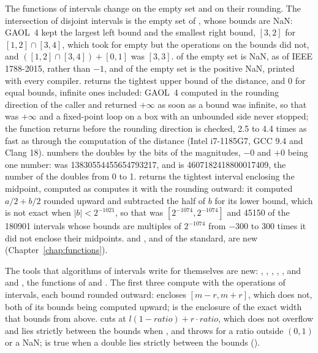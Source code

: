 \documentclass[12pt,a4paper,twoside,openright]{book}
\begin{document}
\medskip
The functions of intervals change on the empty set and on their
rounding.\newinvfive{} The intersection of disjoint intervals is the empty
set of , whose bounds are NaN: GAOL~4 kept the
largest left bound and the smallest right bound, $[3, 2]$ for
$[1, 2] \cap [3, 4]$, which  took for empty but the
operations on the bounds did not, and $([1, 2] \cap [3, 4]) + [0, 1]$ was
$[3, 3]$.  of the empty set is NaN, as  of IEEE
1788-2015, rather than $-1$, and  of the empty set is the
positive NaN, printed  with every compiler. 
returns the tightest upper bound of the distance, and 0 for equal bounds,
infinite ones included: GAOL~4 computed  in the rounding
direction of the caller and returned $+\infty$ as soon as a bound was
infinite, so that  was $+\infty$ and a
fixed-point loop on a box with an unbounded side never stopped; the function
returns before the rounding direction is checked, 2.5 to 4.4 times as fast as
through the computation of the distance (Intel i7-1185G7, GCC 9.4 and Clang
18).  numbers the doubles by the bits of the
magnitudes, $-0$ and $+0$ being one number: 
was 13830554455654793217, and is 4607182418800017409, the number of the
doubles from 0 to 1.  returns the tightest interval enclosing the
midpoint, computed as  computes it with the rounding
outward: it computed $a/2 + b/2$ rounded upward and subtracted the half of
$b$ for its lower bound, which is not exact when $|b| < 2^{-1021}$, so that
 was $[2^{-1074}, 2^{-1074}]$ and 45150 of the
180901 intervals whose bounds are multiples of $2^{-1074}$ from $-300$ to
$300$ times it did not enclose their midpoints.  and
,  and  of the standard, are new
(Chapter~\ref{chap:functions}).

\medskip
The tools that algorithms of intervals write for themselves are
new:\newinvfive{} , ,
, , ,
and  and , the functions of
 and . The first three compute with the operations
of intervals, each bound rounded outward: 
encloses $[m - r, m + r]$, which  does not, both
of its bounds being computed upward;  is the
enclosure of the exact width that  bounds from above.
 cuts at $l(1 - \mathit{ratio}) + r \cdot \mathit{ratio}$,
which does not overflow and lies strictly between the bounds when
, and throws  for a ratio
outside $(0, 1)$ or a NaN;  is true when a double
lies strictly between the bounds ().
\end{document}
